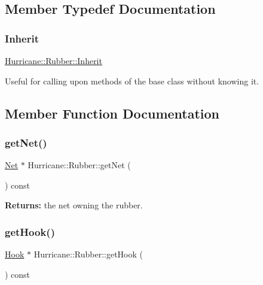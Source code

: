 \subsection{Member Typedef Documentation}
\mbox{\label{classHurricane_1_1Rubber_aa74649cee7cda714020e77194af2210a}} 
\subsubsection{\texorpdfstring{Inherit}{Inherit}}
{\footnotesize\ttfamily \hyperlink{classHurricane_1_1Rubber_aa74649cee7cda714020e77194af2210a}{Hurricane\+::\+Rubber\+::\+Inherit}}

Useful for calling upon methods of the base class without knowing it. 

\subsection{Member Function Documentation}
\mbox{\label{classHurricane_1_1Rubber_a3d4156388d0a9e53daa00cdae9732e12}} 
\subsubsection{\texorpdfstring{get\+Net()}{getNet()}}
{\footnotesize\ttfamily \hyperlink{classHurricane_1_1Net}{Net} $\ast$ Hurricane\+::\+Rubber\+::get\+Net (\begin{DoxyParamCaption}{ }\end{DoxyParamCaption}) const\hspace{0.3cm}{\ttfamily [inline]}}

{\bfseries Returns\+:} the net owning the rubber. \mbox{\label{classHurricane_1_1Rubber_a9f7b9bc21b4df4c2bac602f045477711}} 
\subsubsection{\texorpdfstring{get\+Hook()}{getHook()}}
{\footnotesize\ttfamily \hyperlink{classHurricane_1_1Hook}{Hook} $\ast$ Hurricane\+::\+Rubber\+::get\+Hook (\begin{DoxyParamCaption}{ }\end{DoxyParamCaption}) const\hspace{0.3cm}{\ttfamily [inline]}}

